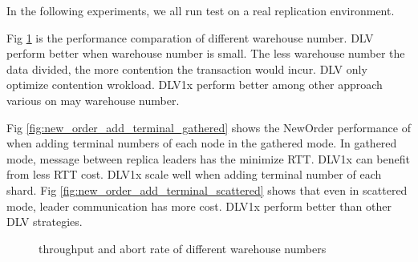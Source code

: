 \documentclass[conference]{IEEEtran}
\begin{document}
In the following experiments,
we all run test on a real replication environment.

Fig \ref{fig:plot_tpcc_neworder_add_Warehouse_Warehouse_gather} is the performance comparation of different warehouse number.
DLV perform better when warehouse number is small.
The less warehouse number the data divided, the more contention the transaction would incur.
DLV only optimize contention wrokload.
DLV1x perform better among other approach various on may warehouse number.


Fig \ref{fig:new_order_add_terminal_gathered} shows the NewOrder performance of when adding terminal numbers of each node in the gathered mode.
In gathered mode, message between replica leaders has the minimize RTT.
DLV1x can benefit from less RTT cost.
DLV1x scale well when adding terminal number of each shard.
Fig \ref{fig:new_order_add_terminal_scattered} shows that even in scattered mode, leader communication has more cost.
DLV1x perform better than other DLV strategies.


\begin{figure}[htbp]
  \centering

\caption{throughput and abort rate of
different warehouse numbers}
\label{fig:plot_tpcc_neworder_add_Warehouse_Warehouse_gather}
\end{figure}
\end{document}
